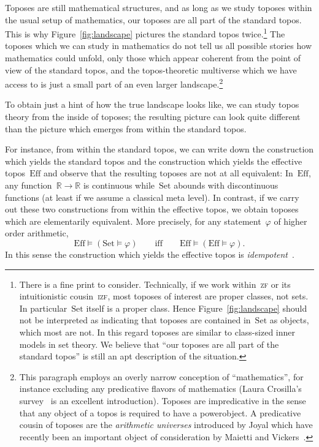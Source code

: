 \documentclass[oneside,reqno]{amsart}
\theoremstyle{definition}
\theoremstyle{plain}
\theoremstyle{remark}
\newcommand{\RR}{\mathbb{R}}
\newcommand{\Set}{\mathrm{Set}}
\newcommand{\Eff}{\mathrm{Ef{}f}}
\renewcommand{\_}{\mathpunct{.}\,}
\newcommand{\effective}{ef{}fective\xspace}
\newcommand{\?}{\,{:}\,}
\begin{document}
Toposes are still mathematical structures, and as long as we study
toposes within the usual setup of mathematics, our toposes are all part of the
standard topos. This is why Figure~\ref{fig:landscape} pictures the standard
topos twice.\footnote{There is a fine print to consider. Technically, if we
work within~\textsc{zf} or its intuitionistic cousin~\textsc{izf}, most toposes
of interest are proper classes, not sets. In particular~$\Set$ itself is a
proper class. Hence Figure~\ref{fig:landscape} should not be interpreted as
indicating that toposes are contained in~$\Set$ as objects, which most are not.
In this regard toposes are similar to class-sized inner models in set theory.
We believe that ``our toposes are all part of the standard topos'' is still an
apt description of the situation.}
The toposes which we can study in mathematics do not tell us
all possible stories how mathematics could unfold, only those which appear
coherent from the point of view of the standard topos, and the topos-theoretic
multiverse which we have access to is just a small part of an even larger
landscape.\footnote{This paragraph employs an overly narrow conception of
``mathematics'', for instance excluding any predicative flavors of mathematics
(Laura Crosilla's survey~\cite{crosilla:predicative} is an excellent introduction).
Toposes are impredicative in the sense that any object of a topos is required to have a
powerobject. A predicative cousin of toposes are the \emph{arithmetic
universes} introduced by Joyal which have recently been an important object of
consideration by Maietti and
Vickers~\cite{maietti:au,maietti-vickers:induction,vickers:sketches}.}

To obtain just a hint of how the true landscape looks like, we can study topos
theory from the inside of toposes; the resulting picture can look quite
different than the picture which emerges from within the standard topos.

For instance, from within the standard topos, we can write down the
construction which yields the standard topos and the construction which yields
the \effective topos~$\Eff$ and observe that the resulting toposes are not at
all equivalent: In~$\Eff$, any function~$\RR \to \RR$ is continuous
while~$\Set$ abounds with discontinuous functions (at least if we assume a
classical meta level). In contrast, if we carry out these two constructions
from within the \effective topos, we obtain toposes which are elementarily
equivalent. More precisely, for any statement~$\varphi$ of higher order
arithmetic,
\[ \Eff \models (\Set \models \varphi) \qquad\text{iff}\qquad\Eff \models
  (\Eff \models \varphi). \]
In this sense the construction which yields the \effective topos is
\emph{idempotent}~\cite[Section~3.8.3]{oosten:realizability}.
\end{document}

